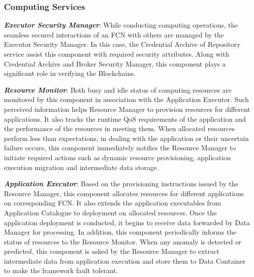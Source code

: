 \documentclass[final,5p,times,twocolumn]{elsarticle}
\begin{document}
\subsubsection{Computing Services}
%
\par \textbf{\textit{Executor Security Manager}}: While conducting computing operations, the seamless secured interactions of an FCN with others are managed by the Executor Security Manager. In this case, the Credential Archive of Repository service assist this component with required security attributes. Along with Credential Archive and Broker Security Manager, this component plays a significant role in verifying the Blockchains.    
% 
\par \textbf{\textit{Resource Monitor}}: Both busy and idle status of computing resources are monitored by this component in association with the Application Executor. Such perceived information helps Resource Manager to provision resources for different applications. It also tracks the runtime QoS requirements of the application and the performance of the resources in meeting them. When allocated resources perform less than expectations, in dealing with the application or their uncertain failure occurs, this component immediately notifies the Resource Manager to initiate required actions such as dynamic resource provisioning, application execution migration and intermediate data storage.   
%
\par \textbf{\textit{Application Executor}}: Based on the provisioning instructions issued by the Resource Manager, this component allocates resources for different applications on corresponding FCN. It also extends the application executables from Application Catalogue to deployment on allocated resources. Once the application deployment is conducted, it begins to receive data forwarded by Data Manager for  processing. In addition, this component periodically informs the status of resources to the Resource Monitor. When any anomaly is detected or predicted, this component is asked by the Resource Manager to extract intermediate data from application execution and store them to Data Container to make the framework fault tolerant.
%
\end{document}
